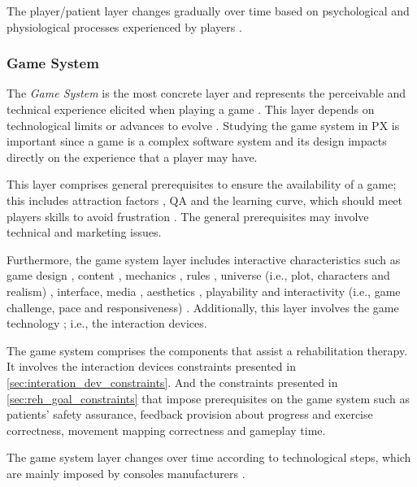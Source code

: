The player/patient layer changes gradually over time based on psychological and physiological processes experienced by players \autocite{Nackea2}.

\subsubsection*{Game System}
The \textit{Game System} is the most concrete layer and represents the perceivable and technical experience elicited when playing a game \autocite{Nackea2,Elson2014,Nackea,Nacked}. This layer depends on technological limits or advances to evolve \autocite{Fernandez2008}. Studying the game system in \ac{PX} is important since a game is a complex software system \autocite{Mayra,Nackea} and its design impacts directly on the experience that a player may have.

This layer comprises general prerequisites to ensure the availability of a game; this includes attraction factors \autocite{Elson2014}, \ac{QA} \autocite{Nacked} and the learning curve, which should meet players skills to avoid frustration \autocite{Nacked}. The general prerequisites may involve technical \autocite{Fernandez2008,Engl2013,Nackea2} and marketing \autocite{Nacked} issues.

Furthermore, the game system layer includes interactive characteristics such as game design \autocite{Nacked}, content \autocite{Elson2014,Nackea2,Fernandez2008}, mechanics \autocite{Elson2014,Ferrara}, rules \autocite{Nackea}, universe (i.e., plot, characters and realism) \autocite{Fernandez2008,Ferrara}, interface, media \autocite{DeKort2007b,Fernandez2008}, aesthetics \autocite{Ferrara}, playability \autocite{Engl2013,Fernandez2008} and interactivity (i.e., game challenge, pace and responsiveness) \autocite{Fernandez2008}. Additionally, this layer involves the game technology \autocite{Engl2013,Fernandez2008}; i.e., the interaction devices.

The game system comprises the components that assist a rehabilitation therapy. It involves the interaction devices constraints presented in \autoref{sec:interation_dev_constraints}. And the constraints presented in \autoref{sec:reh_goal_constraints} that impose prerequisites on the game system such as patients' safety assurance, feedback provision about progress and exercise correctness, movement mapping correctness and gameplay time.

The game system layer changes over time according to technological steps, which are mainly imposed by consoles manufacturers \autocite{Nackea,Nackea2}.

